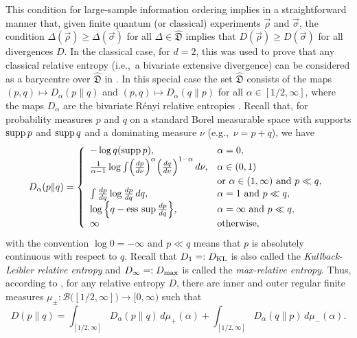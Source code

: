 \documentclass[12pt,a4paper,reqno]{amsart}
\theoremstyle{definition}
\newcommand{\mc}[1]{\mathcal{#1}}
\newcommand{\mf}[1]{\mathfrak{#1}}
\let\originalleft\left
\let\originalright\right
\renewcommand{\left}{\mathopen{}\mathclose\bgroup\originalleft}
\renewcommand{\right}{\aftergroup\egroup\originalright}
\begin{document}
This condition for large-sample information ordering implies in a straightforward manner that, given finite quantum (or classical) experiments $\vec{\rho}$ and $\vec{\sigma}$, the condition $\Delta(\vec{\rho})\geq\Delta(\vec{\sigma})$ for all $\Delta\in\hat{\mf D}$ implies that  $D(\vec{\rho})\geq D(\vec{\sigma})$ for all divergences $D$. In the classical case, for $d=2$, this was used to prove that any classical relative entropy (i.e.,\ a bivariate extensive divergence) can be considered as a barycentre over $\hat{\mf D}$ in \cite{Mu_et_al_2021}. In this special case the set $\hat{\mf D}$ consists of the maps $(p,q)\mapsto D_\alpha(p\|q)$ and $(p,q)\mapsto D_\alpha(q\|p)$ for all $\alpha\in[1/2,\infty]$, where the maps $D_\alpha$ are the bivariate R\'{e}nyi relative entropies \cite{Renyi61}. Recall that, for probability measures $p$ and $q$ on a standard Borel measurable space with supports ${\rm supp}\,p$ and ${\rm supp}\,q$ and a dominating measure $\nu$ (e.g.,\ $\nu=p+q$), we have
\begin{equation}\label{eq:RenyiRelEntr}
D_\alpha(p\|q)=\left\{\begin{array}{ll}
-\log{q({\rm supp}\,p)},&\alpha=0,\\
\frac{1}{\alpha-1}\log{\int \left(\frac{dp}{d\nu}\right)^\alpha\left(\frac{dq}{d\nu}\right)^{1-\alpha}}\,d\nu,&\alpha\in(0,1)\\
&{\rm or}\ \alpha\in(1,\infty)\ {\rm and}\ p\ll q,\\
\int \frac{dp}{dq}\log{\frac{dp}{dq}}\,dq,&\alpha=1\ {\rm and}\ p\ll q,\\
\log{\left\{q-{\rm ess}\,\sup \frac{dp}{dq}\right\}},&\alpha=\infty\ {\rm and}\ p\ll q,\\
\infty&{\rm otherwise},
\end{array}\right.
\end{equation}
with the convention $\log{0}=-\infty$ and $p\ll q$ means that $p$ is absolutely continuous with respect to $q$. Recall that $D_1=:D_{\rm KL}$ is also called the {\it Kullback-Leibler relative entropy} and $D_\infty=:D_{\rm max}$ is called the {\it max-relative entropy}. Thus, according to \cite{Mu_et_al_2021}, for any relative entropy $D$, there are inner and outer regular finite measures $\mu_\pm:\mc B\big([1/2,\infty]\big)\to[0,\infty)$ such that
\begin{equation}\label{eq:RenyiBarycentre}
D(p\|q)=\int_{[1/2,\infty]}D_\alpha(p\|q)\,d\mu_+(\alpha)+\int_{[1/2,\infty]}D_\alpha(q\|p)\,d\mu_-(\alpha).
\end{equation}
\end{document}
